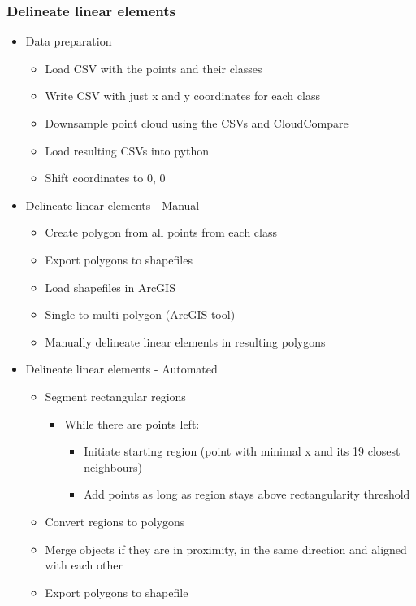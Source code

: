 \subsubsection{Delineate linear elements}
	\begin{itemize}
		\item Data preparation
		\begin{itemize}
			\item Load CSV with the points and their classes
			\item Write CSV with just x and y coordinates for each class
			\item Downsample point cloud using the CSVs and CloudCompare
			\item Load resulting CSVs into python
			\item Shift coordinates to 0, 0
		\end{itemize}
		
		\item Delineate linear elements - Manual
		\begin{itemize}
			\item Create polygon from all points from each class
			\item Export polygons to shapefiles
			\item Load shapefiles in ArcGIS
			\item Single to multi polygon (ArcGIS tool)
			\item Manually delineate linear elements in resulting polygons
		\end{itemize}
		
		\item Delineate linear elements - Automated
		\begin{itemize}
			\item Segment rectangular regions
			\begin{itemize}
				\item While there are points left:
				\begin{itemize}
					\item Initiate starting region (point with minimal x and its 19 closest neighbours)
					\item Add points as long as region stays above rectangularity threshold
				\end{itemize}
			\end{itemize}
		
			\item Convert regions to polygons
			\item Merge objects if they are in proximity, in the same direction and aligned with each other
			\item Export polygons to shapefile
		\end{itemize}
		

\end{itemize}
